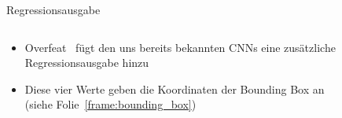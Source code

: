 \documentclass{beamer}
\begin{document}
\begin{frame}{Regressionsausgabe}
    \begin{columns}
        \begin{column}{0.6\textwidth}
            \begin{itemize}
                \item Overfeat~\cite{sermanet2013overfeat} fügt den uns bereits bekannten CNNs eine zusätzliche Regressionsausgabe hinzu
                \item Diese vier Werte geben die Koordinaten der Bounding Box an (siehe Folie~\ref{frame:bounding_box})
            \end{itemize}
        \end{column}
        \begin{column}{0.4\textwidth}
            \begin{figure}
                \centering
            \end{figure}
        \end{column}
    \end{columns}
\end{frame}
\end{document}
